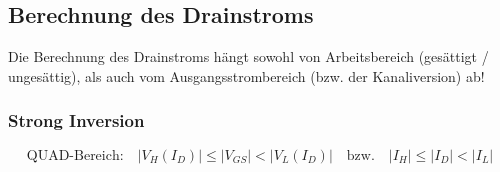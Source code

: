 


    








\subsection{Berechnung des Drainstroms}

Die Berechnung des Drainstroms hängt sowohl von Arbeitsbereich (gesättigt / ungesättig), als auch vom Ausgangsstrombereich (bzw. der Kanaliversion) ab!


\subsubsection{Strong Inversion}

\vspace{-0.3cm}

\[ \boxed{ \text{QUAD-Bereich:} \quad |V_H(I_D)| \leq |V_{GS}| < |V_L(I_D)| \quad \text{bzw.} \quad |I_H| \leq |I_D| < |I_L| } \]  %

